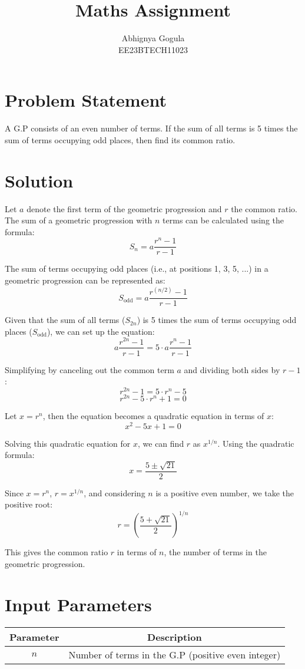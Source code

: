 \documentclass{article}
\begin{document}
\title{Maths Assignment}
\author{Abhignya Gogula\\
        EE23BTECH11023}
\maketitle

\section*{Problem Statement}
A G.P consists of an even number of terms. If the sum of all terms is 5 times the sum of terms occupying odd places, then find its common ratio.

\section*{Solution}
Let \( a \) denote the first term of the geometric progression and \( r \) the common ratio. The sum of a geometric progression with \( n \) terms can be calculated using the formula:
\[ S_n = a \frac{{r^n - 1}}{{r - 1}} \]

The sum of terms occupying odd places (i.e., at positions 1, 3, 5, ...) in a geometric progression can be represented as:
\[ S_{\text{odd}} = a \frac{{r^{(n/2)} - 1}}{{r - 1}} \]

Given that the sum of all terms (\( S_{2n} \)) is 5 times the sum of terms occupying odd places (\( S_{\text{odd}} \)), we can set up the equation:
\[ a \frac{{r^{2n} - 1}}{{r - 1}} = 5 \cdot a \frac{{r^n - 1}}{{r - 1}} \]

Simplifying by canceling out the common term \( a \) and dividing both sides by \( r - 1 \):
\[ r^{2n} - 1 = 5 \cdot r^n - 5 \]
\[ r^{2n} - 5 \cdot r^n + 1 = 0 \]

Let \( x = r^n \), then the equation becomes a quadratic equation in terms of \( x \):
\[ x^2 - 5x + 1 = 0 \]

Solving this quadratic equation for \( x \), we can find \( r \) as \( x^{1/n} \). Using the quadratic formula:
\[ x = \frac{{5 \pm \sqrt{21}}}{2} \]

Since \( x = r^n \), \( r = x^{1/n} \), and considering \( n \) is a positive even number, we take the positive root:
\[ r = \left(\frac{{5 + \sqrt{21}}}{2}\right)^{1/n} \]

This gives the common ratio \( r \) in terms of \( n \), the number of terms in the geometric progression.

\section*{Input Parameters}
\begin{center}
\begin{tabular}{|c|c|}
\hline
Parameter & Description \\
\hline
\( n \) & Number of terms in the G.P (positive even integer) \\
\hline
\end{tabular}
\end{center}
\end{document}
